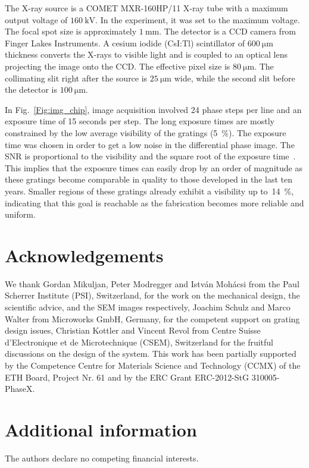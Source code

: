 \documentclass[english]{nature}
\begin{document}
The X-ray source is a COMET MXR-160HP/11 X-ray tube with a maximum output
voltage of $\SI{160}{\kilo\volt}$. In the experiment, it was set to the
maximum voltage. The focal spot size is approximately
$\SI{1}{\milli\metre}$. The detector is a CCD camera from Finger Lakes
Instruments. A cesium iodide (CsI:Tl) scintillator of $\SI{600}{\micro
\metre}$ thickness converts the X-rays to visible light and is coupled to
an optical lens projecting the image onto the CCD\@. The effective pixel size
is $\SI{80}{\micro\metre}$. The collimating slit right after the source is 
$\SI{25}{\micro\metre}$ wide, while the second slit before the detector is
$\SI{100}{\micro\metre}$.

In Fig.~\ref{Fig:img_chip}, image acquisition involved 24 phase steps per
line and an exposure time of 15 seconds per step. The long
exposure times are mostly constrained by the low average visibility of the
gratings (\SI{5}{\percent}). The exposure time was chosen in order to
get a low noise in the differential phase image. The \ac{SNR} is
proportional to the visibility and the square root of the exposure
time~\cite{Raupach2011}.
This implies that the exposure times can easily drop by an order of
magnitude as these gratings become comparable in quality to those developed
in the last ten years. 
Smaller regions of these gratings already exhibit a visibility up
to~\SI{14}{\percent}, indicating that this goal is reachable as the
fabrication becomes more reliable and uniform.

\section*{Acknowledgements}
We thank Gordan Mikuljan, Peter Modregger and István Mohácsi from the Paul
Scherrer Institute (PSI), Switzerland, for the
work on the mechanical design, the scientific advice, and the \ac{SEM} images
respectively, Joachim Schulz and Marco Walter from
Microworks GmbH, Germany, for the competent support on grating design
issues, Christian Kottler and Vincent Revol from Centre Suisse
d'Electronique et de Microtechnique (CSEM), Switzerland for the fruitful
discussions on the design of the system. This work has been partially
supported by the Competence Centre for Materials Science and Technology
(CCMX) of the ETH Board, Project Nr. 61 and by the ERC Grant ERC-2012-StG 310005-PhaseX.

\section*{Additional information}
The authors declare no competing financial interests.
\end{document}
